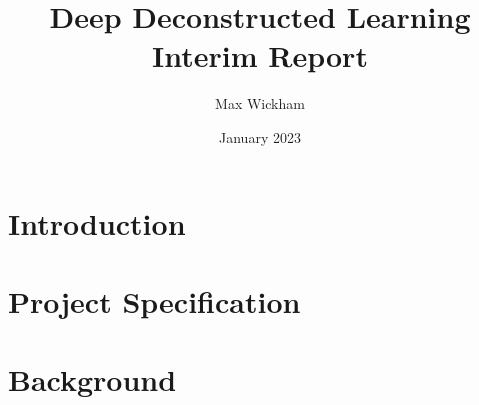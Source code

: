 \documentclass{article}
\title{Deep Deconstructed Learning \\
 Interim Report}
\author{Max Wickham }
\date{January 2023}
\begin{document}
\maketitle

\section{Introduction}

\section{Project Specification}


\newpage
\section{Background}




\end{document}
